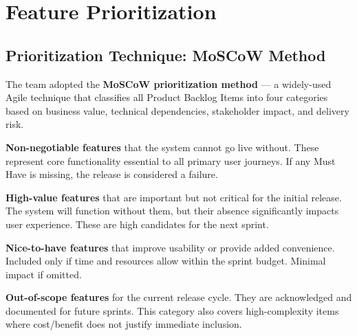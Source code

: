 \documentclass[12pt,a4paper]{article}
\begin{document}
\section{Feature Prioritization}

\subsection{Prioritization Technique: MoSCoW Method}

\begin{tcolorbox}[notebox]
The team adopted the \textbf{MoSCoW prioritization method} --- a widely-used Agile technique that classifies all Product Backlog Items into four categories based on business value, technical dependencies, stakeholder impact, and delivery risk.
\end{tcolorbox}

\vspace{4pt}
\begin{tcolorbox}[moscowbox=mustcolor,title={M --- Must Have}]
\textbf{Non-negotiable features} that the system cannot go live without. These represent core functionality essential to all primary user journeys. If any Must Have is missing, the release is considered a failure.
\end{tcolorbox}

\vspace{3pt}
\begin{tcolorbox}[moscowbox=shouldcolor,title={S --- Should Have}]
\textbf{High-value features} that are important but not critical for the initial release. The system will function without them, but their absence significantly impacts user experience. These are high candidates for the next sprint.
\end{tcolorbox}

\vspace{3pt}
\begin{tcolorbox}[moscowbox=couldcolor,title={C --- Could Have}]
\textbf{Nice-to-have features} that improve usability or provide added convenience. Included only if time and resources allow within the sprint budget. Minimal impact if omitted.
\end{tcolorbox}

\vspace{3pt}
\begin{tcolorbox}[moscowbox=wontcolor,title={W --- Won't Have (this time)}]
\textbf{Out-of-scope features} for the current release cycle. They are acknowledged and documented for future sprints. This category also covers high-complexity items where cost/benefit does not justify immediate inclusion.
\end{tcolorbox}
\end{document}
